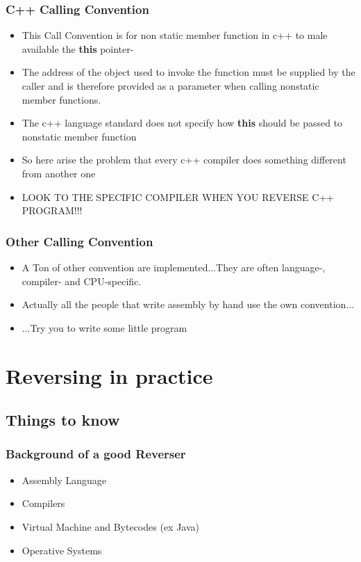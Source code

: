 \documentclass[]{beamer}
\begin{document}
		\begin{frame}
			\frametitle{C++ Calling Convention}
			\begin{itemize}
				\item{This Call Convention is for non static member function in c++ to male available the \textbf{this} pointer-}
				\item{The address of the object used to invoke the function must be supplied by the caller and is therefore provided as a parameter when calling nonstatic member functions.}
				\item{The c++ language standard does not specify how \textbf{this} should be passed to nonstatic member function}
				\item{So here arise the problem that every c++ compiler does something different from another one}
				\item{\color{red} LOOK TO THE SPECIFIC COMPILER WHEN YOU REVERSE C++ PROGRAM!!!}
			\end{itemize}
		\end{frame}
		\begin{frame}
			\frametitle{Other Calling Convention}
			\begin{itemize}
				\item{A Ton of other convention are implemented...They are often language-, compiler- and CPU-specific.}
				\item{Actually all the people that write assembly by hand use the own convention...}
				\item{...Try you to write some little program }
			\end{itemize}
		\end{frame}
\section{Reversing in practice}
	\subsection{Things to know}
		\begin{frame}
		\frametitle{Background of a good Reverser}
			\begin{itemize}
				\item{Assembly Language}
				\item{Compilers}
				\item{Virtual Machine and Bytecodes (ex Java)}
				\item{Operative Systems}
			\end{itemize}
		\end{frame}
\end{document}
